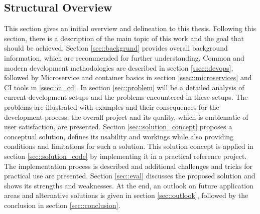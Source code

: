 \documentclass[12pt, a4paper]{article}
\begin{document}
    \subsection{Structural Overview}
    This section gives an initial overview and delineation to this thesis. Following this section, there is a description of the main topic of this work and the goal that should be achieved. Section \ref{sec::backgrund} provides overall background information, which are recommended for further understanding. Common and modern development methodologies are described in section \ref{ssec::devops}, followed by Microservice and container basics in section \ref{ssec::microservices} and \acl{CI} tools in \ref{ssec::ci_cd}. In section \ref{sec::problem} will be a detailed analysis of current development setups and the problems encountered in these setups. The problems are illustrated with examples and their consequences for the development process, the overall project and its quality, which is emblematic of user satisfaction, are presented. Section \ref{sec::solution_concept} proposes a conceptual solution, defines its usability and workings while also providing conditions and limitations for such a solution. This solution concept is applied in section \ref{sec::solution_code} by implementing it in a practical reference project. The implementation process is described and additional challenges and tricks for practical use are presented. Section \ref{sec::eval} discusses the proposed solution and shows its strengths and weaknesses. At the end, an outlook on future application areas and alternative solutions is given in section \ref{sec::outlook}, followed by the conclusion in section \ref{sec::conclusion}.
\end{document}
